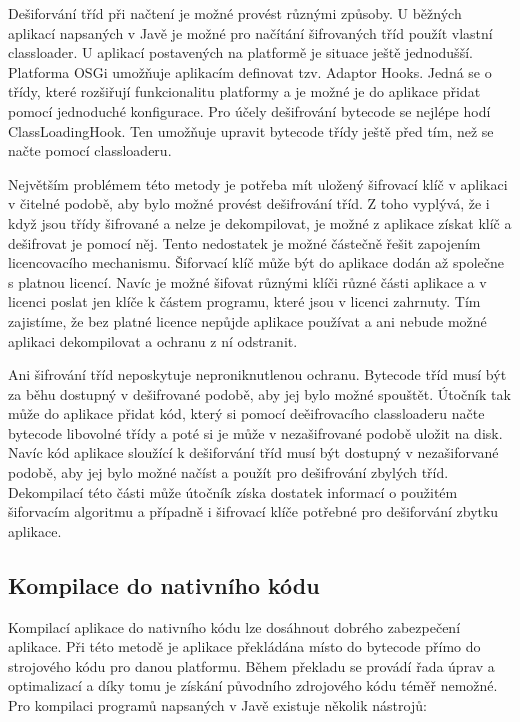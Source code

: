 Dešiforvání tříd při načtení je možné provést různými způsoby. U běžných
aplikací napsaných v Javě je možné pro načítání šifrovaných tříd použít vlastní
classloader. U aplikací postavených na platformě  je situace ještě
jednodušší. Platforma \gls{OSGi} umožňuje aplikacím definovat tzv. Adaptor
Hooks. Jedná se o třídy, které rozšiřují funkcionalitu platformy a je možné je
do aplikace přidat pomocí jednoduché konfigurace. Pro účely dešifrování bytecode
se nejlépe hodí ClassLoadingHook. Ten umožňuje upravit bytecode třídy ještě před
tím, než se načte pomocí classloaderu.

Největším problémem této metody je potřeba mít uložený šifrovací klíč v
aplikaci v čitelné podobě, aby bylo možné provést dešifrování tříd. Z toho
vyplývá, že i když jsou třídy šifrované a nelze je dekompilovat, je možné z
aplikace získat klíč a dešifrovat je pomocí něj. Tento nedostatek je možné
částečně řešit zapojením licencovacího mechanismu. Šiforvací klíč může
být do aplikace dodán až společne s platnou licencí. Navíc je možné šifovat
různými klíči různé části aplikace a v licenci poslat jen klíče k částem
programu, které jsou v licenci zahrnuty. Tím zajistíme, že bez platné licence
nepůjde aplikace používat a ani nebude možné aplikaci dekompilovat a ochranu z
ní odstranit.

Ani šifrování tříd neposkytuje neproniknutlenou ochranu. Bytecode tříd musí být
za běhu dostupný v dešifrované podobě, aby jej bylo možné spouštět. Útočník tak
může do aplikace přidat kód, který si pomocí deěifrovacího classloaderu načte
bytecode libovolné třídy a poté si je může v nezašifrované podobě uložit na
disk. Navíc kód aplikace sloužící k dešiforvání tříd musí být dostupný v
nezašiforvané podobě, aby jej bylo možné načíst a použít pro dešifrování zbylých
tříd. Dekompilací této části může útočník získa dostatek informací o použitém
šiforvacím algoritmu a případně i šifrovací klíče potřebné pro dešiforvání
zbytku aplikace.

\subsection{Kompilace do nativního kódu}

Kompilací aplikace do nativního kódu lze dosáhnout dobrého zabezpečení aplikace.
Při této metodě je aplikace překládána místo do bytecode přímo do strojového
kódu pro danou platformu. Během překladu se provádí řada úprav a optimalizací a
díky tomu je získání původního zdrojového kódu téměř nemožné. Pro kompilaci
programů napsaných v Javě existuje několik nástrojů:

